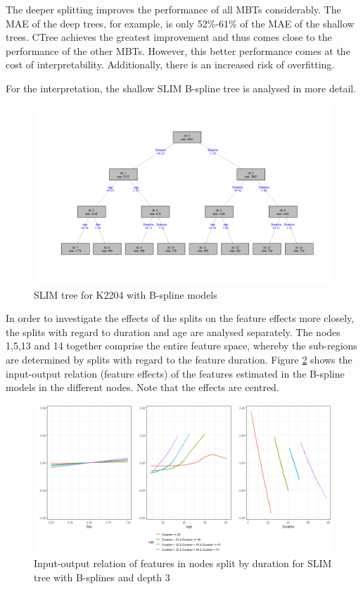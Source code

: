 The deeper splitting improves the performance of all MBTs considerably. The MAE of the deep trees, for example, is only 52\%-61\% of the MAE of the shallow trees. CTree achieves the greatest improvement and thus comes close to the performance of the other MBTs. However, this better performance comes at the cost of interpretability. Additionally, there is an increased risk of overfitting.



For the interpretation, the shallow SLIM B-spline tree is analysed in more detail.

\begin{figure}[!htb]
    \centering   
    \includegraphics[width = 16cm]{Figures/insurance_use_case/k2204_BPV/slim_bsplines_small_tree.png}
         \caption{SLIM tree for K2204 with B-spline models}
     \label{fig:ins_slim_bsplines_tree}
\end{figure}

In order to investigate the effects of the splits on the feature effects more closely, the splits with regard to duration and age are analysed separately.
The nodes 1,5,13 and 14 together comprise the entire feature space, whereby the sub-regions are determined by splits with regard to the feature duration.
Figure \ref{fig:ins_k2204_effects_duration} shows the input-output relation (feature effects) of the features estimated in the B-spline models in the different nodes. Note that the effects are centred.

\begin{figure}[!htb]
    \centering
    \includegraphics[width = 16cm]{Figures/insurance_use_case/k2204_BPV/effects_duration.png}
    \caption{Input-output relation of features in nodes split by duration for SLIM tree with B-splines and depth 3}
    \label{fig:ins_k2204_effects_duration}
\end{figure}

